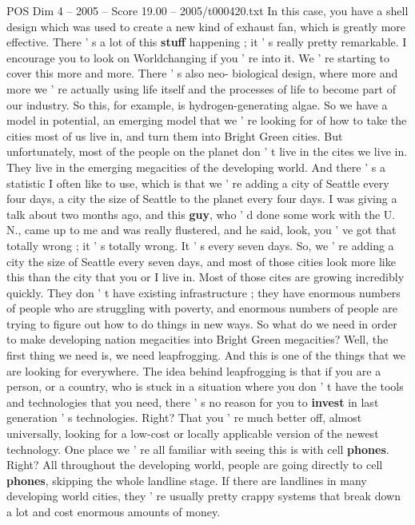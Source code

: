 \begin{textsample}{POS Dim 4 – 2005 – Score 19.00 – 2005/t000420.txt}
In this case, you have a shell design which was used to create a new kind of exhaust fan, which is greatly more effective.
There ' s a lot of this \textbf{stuff} happening ; it ' s really pretty remarkable.
I encourage you to look on Worldchanging if you ' re into it.
We ' re starting to cover this more and more.
There ' s also neo- biological design, where more and more we ' re actually using life itself and the processes of life to become part of our industry.
So this, for example, is hydrogen-generating algae.
So we have a model in potential, an emerging model that we ' re looking for of how to take the cities most of us live in, and turn them into Bright Green cities.
But unfortunately, most of the people on the planet don ' t live in the cites we live in.
They live in the emerging megacities of the developing world.
And there ' s a statistic I often like to use, which is that we ' re adding a city of Seattle every four days, a city the size of Seattle to the planet every four days.
I was giving a talk about two months ago, and this \textbf{guy}, who ' d done some work with the U.
N., came up to me and was really flustered, and he said, look, you ' ve got that totally wrong ; it ' s totally wrong.
It ' s every seven days.
So, we ' re adding a city the size of Seattle every seven days, and most of those cities look more like this than the city that you or I live in.
Most of those cites are growing incredibly quickly.
They don ' t have existing infrastructure ; they have enormous numbers of people who are struggling with poverty, and enormous numbers of people are trying to figure out how to do things in new ways.
So what do we need in order to make developing nation megacities into Bright Green megacities?
Well, the first thing we need is, we need leapfrogging.
And this is one of the things that we are looking for everywhere.
The idea behind leapfrogging is that if you are a person, or a country, who is stuck in a situation where you don ' t have the tools and technologies that you need, there ' s no reason for you to \textbf{invest} in last generation ' s technologies.
Right?
That you ' re much better off, almost universally, looking for a low-cost or locally applicable version of the newest technology.
One place we ' re all familiar with seeing this is with cell \textbf{phones}.
Right?
All throughout the developing world, people are going directly to cell \textbf{phones}, skipping the whole landline stage.
If there are landlines in many developing world cities, they ' re usually pretty crappy systems that break down a lot and cost enormous amounts of money.

\end{textsample}
